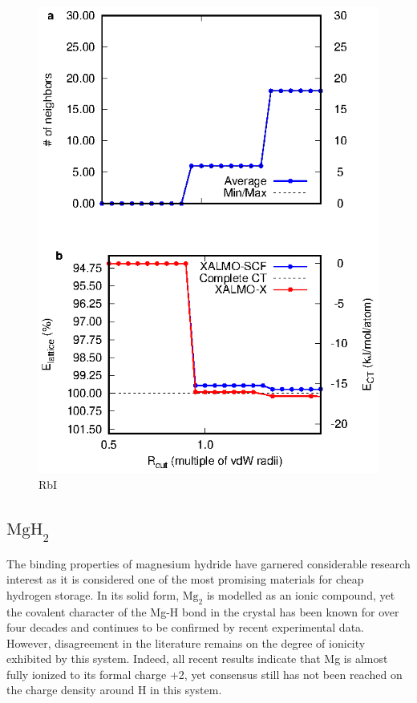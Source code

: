 \documentclass[aps,prb,twocolumn,amsmath,amssymb,superscriptaddress,longbibliography]{revtex4-1}
\begin{document}
\begin{figure}
\includegraphics[scale=1]{./plots/RbI_EvR}
\caption{RbI}
\label{rbi}
\end{figure}




\subsection*{ $\text{MgH}_{2}$ }

The binding properties of magnesium hydride have garnered considerable research interest as it is considered one of the most promising materials for cheap hydrogen storage\cite{}.  
In its solid form, $\text{Mg}_{2}$ is modelled as an ionic compound, yet the covalent character of the Mg-H bond in the crystal has been known for over four decades\cite{oldmgh2} and continues to be confirmed by recent experimental data\cite{mgh2exp}. 
However, disagreement in the literature remains on the degree of ionicity exhibited by this system. 
Indeed, all recent results indicate that Mg is almost fully ionized to its formal charge +2, yet consensus still has not been reached on the charge density around H in this system\cite{[conflicting DFT sources]}.
\end{document}
